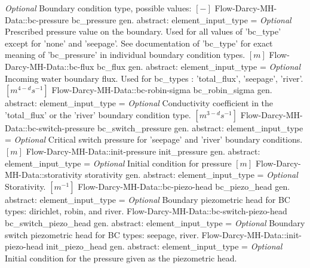 \begin{RecordType}
			{ \it{Optional}}
			{{{Boundary condition type, possible values: }{$[-]$}%
}}
		\RecKey
			{Flow-Darcy-MH-Data::bc-pressure}
			{bc{\_}pressure}
			{{gen. abstract: }}{{element{\_}input{\_}type}{ = }}
			{ \it{Optional}}
			{{{Prescribed pressure value on the boundary.
Used for all values of 'bc{\_}type' except for 'none' and 'seepage'. See documentation of 'bc{\_}type' for exact meaning of 'bc{\_}pressure' in individual boundary condition types. }{$[m]$}%
}}
		\RecKey
			{Flow-Darcy-MH-Data::bc-flux}
			{bc{\_}flux}
			{{gen. abstract: }}{{element{\_}input{\_}type}{ = }}
			{ \it{Optional}}
			{{{Incoming water boundary flux.
Used for bc{\_}types : 'total{\_}flux', 'seepage', 'river'. }{$[m^{4-d}s^{-1}]$}%
}}
		\RecKey
			{Flow-Darcy-MH-Data::bc-robin-sigma}
			{bc{\_}robin{\_}sigma}
			{{gen. abstract: }}{{element{\_}input{\_}type}{ = }}
			{ \it{Optional}}
			{{{Conductivity coefficient in the 'total{\_}flux' or the 'river' boundary condition type. }{$[m^{3-d}s^{-1}]$}%
}}
		\RecKey
			{Flow-Darcy-MH-Data::bc-switch-pressure}
			{bc{\_}switch{\_}pressure}
			{{gen. abstract: }}{{element{\_}input{\_}type}{ = }}
			{ \it{Optional}}
			{{{Critical switch pressure for 'seepage' and 'river' boundary conditions. }{$[m]$}%
}}
		\RecKey
			{Flow-Darcy-MH-Data::init-pressure}
			{init{\_}pressure}
			{{gen. abstract: }}{{element{\_}input{\_}type}{ = }}
			{ \it{Optional}}
			{{{Initial condition for pressure }{$[m]$}%
}}
		\RecKey
			{Flow-Darcy-MH-Data::storativity}
			{storativity}
			{{gen. abstract: }}{{element{\_}input{\_}type}{ = }}
			{ \it{Optional}}
			{{{Storativity. }{$[m^{-1}]$}%
}}
		\RecKey
			{Flow-Darcy-MH-Data::bc-piezo-head}
			{bc{\_}piezo{\_}head}
			{{gen. abstract: }}{{element{\_}input{\_}type}{ = }}
			{ \it{Optional}}
			{{{Boundary piezometric head for BC types: dirichlet, robin, and river.}%
}}
		\RecKey
			{Flow-Darcy-MH-Data::bc-switch-piezo-head}
			{bc{\_}switch{\_}piezo{\_}head}
			{{gen. abstract: }}{{element{\_}input{\_}type}{ = }}
			{ \it{Optional}}
			{{{Boundary switch piezometric head for BC types: seepage, river.}%
}}
		\RecKey
			{Flow-Darcy-MH-Data::init-piezo-head}
			{init{\_}piezo{\_}head}
			{{gen. abstract: }}{{element{\_}input{\_}type}{ = }}
			{ \it{Optional}}
			{{{Initial condition for the pressure given as the piezometric head.}%
}}
\end{RecordType}
